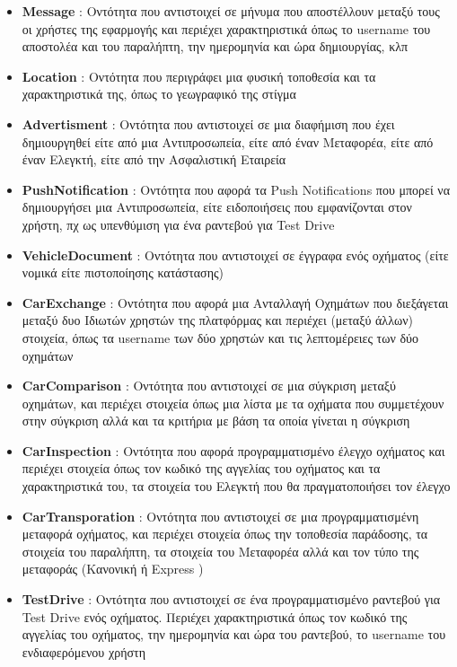 \documentclass{../ol-softwaremanual}
\begin{document}
\begin{itemize}
		\item \en \textbf{Message} \gr : Οντότητα που αντιστοιχεί σε μήνυμα που αποστέλλουν μεταξύ τους οι χρήστες της εφαρμογής και περιέχει χαρακτηριστικά όπως το \en username \gr του αποστολέα και του παραλήπτη, την ημερομηνία και ώρα δημιουργίας, κλπ
		\item \en \textbf{Location} \gr : Οντότητα που περιγράφει μια φυσική τοποθεσία και τα χαρακτηριστικά της, όπως το γεωγραφικό της στίγμα
		\item \en \textbf{Advertisment} \gr : Οντότητα που αντιστοιχεί σε μια διαφήμιση που έχει δημιουργηθεί είτε από μια Αντιπροσωπεία, είτε από έναν Μεταφορέα, είτε από έναν Ελεγκτή, είτε από την Ασφαλιστική Εταιρεία
		\item \en \textbf{PushNotification} \gr : Οντότητα που αφορά τα \en Push Notifications \gr που μπορεί να δημιουργήσει μια Αντιπροσωπεία, είτε ειδοποιήσεις που εμφανίζονται στον χρήστη, πχ ως υπενθύμιση για ένα ραντεβού για \en Test Drive \gr
		\item \en \textbf{VehicleDocument} \gr : Οντότητα που αντιστοιχεί σε έγγραφα ενός οχήματος (είτε νομικά είτε πιστοποίησης κατάστασης)  
		\item \en \textbf{CarExchange} \gr : Οντότητα που αφορά μια Ανταλλαγή Οχημάτων που διεξάγεται μεταξύ δυο Ιδιωτών χρηστών της πλατφόρμας και περιέχει (μεταξύ άλλων) στοιχεία, όπως τα \en username \gr των δύο χρηστών και τις λεπτομέρειες των δύο οχημάτων
		\item \en \textbf{CarComparison} \gr : Οντότητα που αντιστοιχεί σε μια σύγκριση μεταξύ οχημάτων, και περιέχει στοιχεία όπως μια λίστα με τα οχήματα που συμμετέχουν στην σύγκριση αλλά και τα κριτήρια με βάση τα οποία γίνεται η σύγκριση
		\item \en \textbf{CarInspection} \gr : Οντότητα που αφορά προγραμματισμένο έλεγχο οχήματος και περιέχει στοιχεία όπως τον κωδικό της αγγελίας του οχήματος και τα χαρακτηριστικά του, τα στοιχεία του Ελεγκτή που θα πραγματοποιήσει τον έλεγχο 
		\item \en \textbf{CarTransporation} \gr : Οντότητα που αντιστοιχεί σε μια προγραμματισμένη μεταφορά οχήματος, και περιέχει στοιχεία όπως την τοποθεσία παράδοσης, τα στοιχεία του παραλήπτη, τα στοιχεία του Μεταφορέα αλλά και τον τύπο της μεταφοράς (Κανονική ή \en Express \gr)
		\item \en \textbf{TestDrive} \gr : Οντότητα που αντιστοιχεί σε ένα προγραμματισμένο ραντεβού για \en Test Drive \gr ενός οχήματος. Περιέχει χαρακτηριστικά όπως τον κωδικό της αγγελίας του οχήματος, την ημερομηνία και ώρα του ραντεβού, το \en username \gr του ενδιαφερόμενου χρήστη

\end{itemize}
\end{document}
